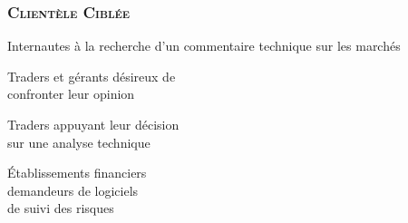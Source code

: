 \documentclass[14pt,a4paper]{beamer}
\begin{document}
{
  
\begin{frame}
\begin{center}
\frametitle{\color{title}\bf\textsc{Clientèle Ciblée}}
\vspace{-6mm}

\large Internautes à la recherche d'un commentaire technique sur les marchés \\
\pause

\vspace{5mm}

\pause

\vspace{5mm}
\normalsize Traders et gérants désireux de \\confronter leur opinion\\
\pause

\vspace{6mm}
\small Traders  appuyant leur décision \\ sur une analyse technique\\
\pause


\vspace{6mm}

\footnotesize Établissements financiers \\  demandeurs de logiciels\\ de suivi des risques
\end{center}
\end{frame}
}

\end{document}
